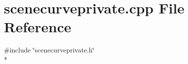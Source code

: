 \section{scenecurveprivate.\+cpp File Reference}
\label{bk3_2curve_2scenecurveprivate_8cpp}
{\ttfamily \#include \char`\"{}scenecurveprivate.\+h\char`\"{}}\\*
